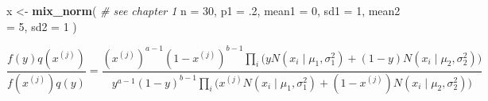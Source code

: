 \documentclass[]{book}
\newenvironment{Shaded}{\begin{snugshade}}{\end{snugshade}}
\newcommand{\CommentTok}[1]{\textcolor[rgb]{0.56,0.35,0.01}{\textit{#1}}}
\newcommand{\DataTypeTok}[1]{\textcolor[rgb]{0.13,0.29,0.53}{#1}}
\newcommand{\DecValTok}[1]{\textcolor[rgb]{0.00,0.00,0.81}{#1}}
\newcommand{\FloatTok}[1]{\textcolor[rgb]{0.00,0.00,0.81}{#1}}
\newcommand{\KeywordTok}[1]{\textcolor[rgb]{0.13,0.29,0.53}{\textbf{#1}}}
\newcommand{\NormalTok}[1]{#1}
\newcommand{\StringTok}[1]{\textcolor[rgb]{0.31,0.60,0.02}{#1}}
\theoremstyle{definition}
\theoremstyle{definition}
\theoremstyle{definition}
\theoremstyle{remark}
\begin{document}
\begin{Shaded}
\begin{Highlighting}[]
\NormalTok{x <-}\StringTok{ }
\StringTok{  }\KeywordTok{mix_norm}\NormalTok{( }\CommentTok{# see chapter 1}
    \DataTypeTok{n =} \DecValTok{30}\NormalTok{,}
    \DataTypeTok{p1 =} \FloatTok{.2}\NormalTok{,}
    \DataTypeTok{mean1 =} \DecValTok{0}\NormalTok{,}
    \DataTypeTok{sd1 =} \DecValTok{1}\NormalTok{,}
    \DataTypeTok{mean2 =} \DecValTok{5}\NormalTok{,}
    \DataTypeTok{sd2 =} \DecValTok{1}
\NormalTok{  )}
\end{Highlighting}
\end{Shaded}

\[\frac{f(y) q(x^{(j)})}{f(x^{(j)}) q(y)} = \frac{(x^{(j)})^{a - 1} (1 - x^{(j)})^{b - 1} \prod\limits_i \Big(y N(x_i \mid \mu_1, \sigma_1^2) + (1 - y) N(x_i \mid \mu_2, \sigma_2^2) \Big)}{y^{a - 1} (1 - y)^{b - 1} \prod\limits_i \Big(x^{(j)} N(x_i \mid \mu_1, \sigma_1^2) + (1 - x^{(j)}) N(x_i \mid \mu_2, \sigma_2^2) \Big)}\]
\end{document}

